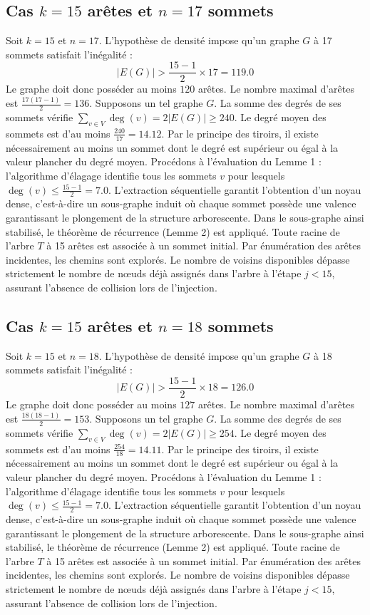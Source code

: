 \documentclass[12pt,a4paper]{article}
\begin{document}
\subsection{Cas $k = 15$ arêtes et $n = 17$ sommets}
Soit $k = 15$ et $n = 17$. L'hypothèse de densité impose qu'un graphe $G$ à 17 sommets satisfait l'inégalité :
$$ |E(G)| > \frac{15-1}{2} \times 17 = 119.0 $$
Le graphe doit donc posséder au moins $120$ arêtes. Le nombre maximal d'arêtes est $\frac{17(17-1)}{2} = 136$.
Supposons un tel graphe $G$. La somme des degrés de ses sommets vérifie $\sum_{v \in V} \deg(v) = 2|E(G)| \geq 240$.
Le degré moyen des sommets est d'au moins $\frac{240}{17} = 14.12$.
Par le principe des tiroirs, il existe nécessairement au moins un sommet dont le degré est supérieur ou égal à la valeur plancher du degré moyen.
Procédons à l'évaluation du Lemme 1 : l'algorithme d'élagage identifie tous les sommets $v$ pour lesquels $\deg(v) \leq \frac{15-1}{2} = 7.0$.
L'extraction séquentielle garantit l'obtention d'un noyau dense, c'est-à-dire un sous-graphe induit où chaque sommet possède une valence garantissant le plongement de la structure arborescente.
Dans le sous-graphe ainsi stabilisé, le théorème de récurrence (Lemme 2) est appliqué. Toute racine de l'arbre $T$ à 15 arêtes est associée à un sommet initial. Par énumération des arêtes incidentes, les chemins sont explorés. Le nombre de voisins disponibles dépasse strictement le nombre de nœuds déjà assignés dans l'arbre à l'étape $j < 15$, assurant l'absence de collision lors de l'injection.

\subsection{Cas $k = 15$ arêtes et $n = 18$ sommets}
Soit $k = 15$ et $n = 18$. L'hypothèse de densité impose qu'un graphe $G$ à 18 sommets satisfait l'inégalité :
$$ |E(G)| > \frac{15-1}{2} \times 18 = 126.0 $$
Le graphe doit donc posséder au moins $127$ arêtes. Le nombre maximal d'arêtes est $\frac{18(18-1)}{2} = 153$.
Supposons un tel graphe $G$. La somme des degrés de ses sommets vérifie $\sum_{v \in V} \deg(v) = 2|E(G)| \geq 254$.
Le degré moyen des sommets est d'au moins $\frac{254}{18} = 14.11$.
Par le principe des tiroirs, il existe nécessairement au moins un sommet dont le degré est supérieur ou égal à la valeur plancher du degré moyen.
Procédons à l'évaluation du Lemme 1 : l'algorithme d'élagage identifie tous les sommets $v$ pour lesquels $\deg(v) \leq \frac{15-1}{2} = 7.0$.
L'extraction séquentielle garantit l'obtention d'un noyau dense, c'est-à-dire un sous-graphe induit où chaque sommet possède une valence garantissant le plongement de la structure arborescente.
Dans le sous-graphe ainsi stabilisé, le théorème de récurrence (Lemme 2) est appliqué. Toute racine de l'arbre $T$ à 15 arêtes est associée à un sommet initial. Par énumération des arêtes incidentes, les chemins sont explorés. Le nombre de voisins disponibles dépasse strictement le nombre de nœuds déjà assignés dans l'arbre à l'étape $j < 15$, assurant l'absence de collision lors de l'injection.
\end{document}
